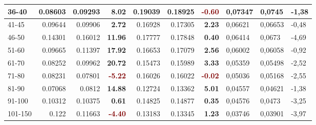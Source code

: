 \begin{table*}[]
\begin{tabular}{|l|r|r|r||r|r|r||l|l|l|}
        36-40     & 0.08603                                 & 0.09293                       & \textbf{\textcolor{OliveGreen}{8.02}}  & 0.19039                    & 0.18925                  & \textbf{\textcolor{Maroon}{-0.60}}    & 0,07347 & 0,0745      & -1,38 \\ \hline
        41-45     & 0.09644                                 & 0.09906                       & \textbf{\textcolor{OliveGreen}{2.72}}  & 0.16928                    & 0.17305                  & \textbf{\textcolor{OliveGreen}{2.23}} & 0,06621 & 0,06653     & -0,48 \\ \hline
        46-50     & 0.14301                                 & 0.16012                       & \textbf{\textcolor{OliveGreen}{11.96}} & 0.17777                    & 0.17848                  & \textbf{\textcolor{OliveGreen}{0.40}} & 0,06414 & 0,0673      & -4,69 \\ \hline
        51-60     & 0.09665                                 & 0.11397                       & \textbf{\textcolor{OliveGreen}{17.92}} & 0.16653                    & 0.17079                  & \textbf{\textcolor{OliveGreen}{2.56}} & 0,06002 & 0,06058     & -0,92 \\ \hline
        61-70     & 0.08252                                 & 0.09962                       & \textbf{\textcolor{OliveGreen}{20.72}} & 0.15473                    & 0.15989                  & \textbf{\textcolor{OliveGreen}{3.33}} & 0,05359 & 0,05498     & -2,52 \\ \hline
        71-80     & 0.08231                                 & 0.07801                       & \textbf{\textcolor{Maroon}{-5.22}}     & 0.16026                    & 0.16022                  & \textbf{\textcolor{Maroon}{-0.02}}    & 0,05036 & 0,05168     & -2,55 \\ \hline
        81-90     & 0.07068                                 & 0.0812                        & \textbf{\textcolor{OliveGreen}{14.88}} & 0.12724                    & 0.13362                  & \textbf{\textcolor{OliveGreen}{5.01}} & 0,04557 & 0,04621     & -1,38 \\ \hline
        91-100    & 0.10312                                 & 0.10375                       & \textbf{\textcolor{OliveGreen}{0.61}}  & 0.14825                    & 0.14877                  & \textbf{\textcolor{OliveGreen}{0.35}} & 0,04576 & 0,0473      & -3,25 \\ \hline
        101-150   & 0.122                                   & 0.11663                       & \textbf{\textcolor{Maroon}{-4.40}}     & 0.13183                    & 0.13345                  & \textbf{\textcolor{OliveGreen}{1.23}} & 0,03746 & 0,03901     & -3,97 \\ \hline

\end{tabular}
\end{table*}
